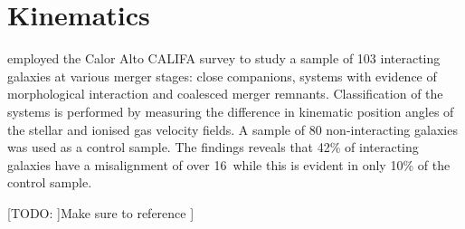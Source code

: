\section{Kinematics}
\label{sec:kinematics}

\citet{2015A&A...582A..21B} employed the Calor Alto CALIFA survey to study a sample of 103 interacting galaxies at various merger stages: close companions, systems with evidence of morphological interaction and coalesced merger remnants. Classification of the systems is performed by measuring the difference in kinematic position angles of the stellar and ionised gas velocity fields. A sample of 80 non-interacting galaxies was used as a control sample. The findings reveals that 42\% of interacting galaxies have a misalignment of over 16\textdegree\ while this is evident in only 10\% of the control sample.

[TODO: ]Make sure to reference \citet{2019MNRAS.483..172D}]
